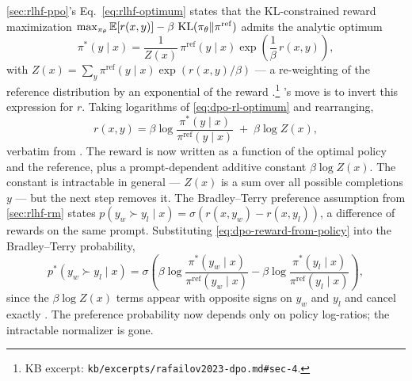 \cref{sec:rlhf-ppo}'s Eq.~\cref{eq:rlhf-optimum} states that the
KL-constrained reward maximization
$\max_{\pi_\theta} \operatorname{\mathbb{E}}[r(x,y)] - \beta\,\operatorname{KL}(\pi_\theta \| \pi^{\mathrm{ref}})$
admits the analytic optimum
\begin{equation}
\pi^*(y \mid x)
  = \frac{1}{Z(x)} \, \pi^{\mathrm{ref}}(y \mid x)
    \exp\!\left(\frac{1}{\beta}\, r(x, y)\right),
\label{eq:dpo-rl-optimum}
\end{equation}
with $Z(x) = \sum_y \pi^{\mathrm{ref}}(y \mid x) \exp(r(x,y)/\beta)$ ---
a re-weighting of the reference distribution by an exponential of the
reward \citep[\S 4, Eq.~4]{rafailov2023-dpo}.\footnote{KB excerpt:
\texttt{kb/excerpts/rafailov2023-dpo.md\#sec-4}.} \citet{rafailov2023-dpo}'s
move is to invert this expression for $r$. Taking logarithms of
\cref{eq:dpo-rl-optimum} and rearranging,
\begin{equation}
r(x, y)
  = \beta \log \frac{\pi^*(y \mid x)}{\pi^{\mathrm{ref}}(y \mid x)}
    \;+\; \beta \log Z(x),
\label{eq:dpo-reward-from-policy}
\end{equation}
verbatim from \citet[\S 4, Eq.~5]{rafailov2023-dpo}. The reward is now
written as a function of the optimal policy and the reference, plus a
prompt-dependent additive constant $\beta \log Z(x)$. The constant is
intractable in general --- $Z(x)$ is a sum over all possible
completions $y$ --- but the next step removes it. The Bradley--Terry
preference assumption from \cref{sec:rlhf-rm} states
$p(y_w \succ y_l \mid x) = \sigma(r(x, y_w) - r(x, y_l))$, a difference
of rewards on the same prompt. Substituting
\cref{eq:dpo-reward-from-policy} into the Bradley--Terry probability,
\begin{equation}
p^*(y_w \succ y_l \mid x)
  = \sigma\!\left(
       \beta \log \frac{\pi^*(y_w \mid x)}{\pi^{\mathrm{ref}}(y_w \mid x)}
       - \beta \log \frac{\pi^*(y_l \mid x)}{\pi^{\mathrm{ref}}(y_l \mid x)}
     \right),
\label{eq:dpo-bt-pref}
\end{equation}
since the $\beta \log Z(x)$ terms appear with opposite signs on $y_w$
and $y_l$ and cancel exactly \citep[\S 4, Eq.~6]{rafailov2023-dpo}.
The preference probability now depends only on policy log-ratios; the
intractable normalizer is gone.

